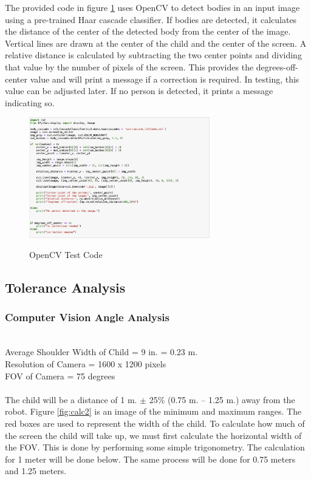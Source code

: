 \documentclass[journal,onecolumn, draftclsnofoot, 12pt]{IEEEtran}
\begin{document}
The provided code in figure \ref{fig:CVModule_TestCode} uses OpenCV to detect bodies in an input image using a pre-trained Haar cascade classifier. If bodies are detected, it calculates the distance of the center of the detected body from the center of the image. Vertical lines are drawn at the center of the child and the center of the screen. A relative distance is calculated by subtracting the two center points and dividing that value by the number of pixels of the screen. This provides the degrees-off-center value and will print a message if a correction is required. In testing, this value can be adjusted later. If no person is detected, it prints a message indicating so.

\begin{figure}[H]
\begin{center}
    \includegraphics[width=0.7\textwidth]{CVModule_TestCode.png}\\
    \caption{ OpenCV Test Code  } 
    \label{fig:CVModule_TestCode}
\end{center}
\end{figure}


\subsection{Tolerance Analysis}

\subsubsection{Computer Vision Angle Analysis}\;\\
\label{sec:anglecalc}
Average Shoulder Width of Child = 9 in. = 0.23 m. \\
Resolution of Camera = 1600 x 1200 pixels \\
FOV of Camera = 75 degrees \\
\\
The child will be a distance of 1 m. $\pm$ 25\% (0.75 m. -- 1.25 m.) away from the robot. Figure \ref{fig:calc2} is an image of the minimum and maximum ranges. The red boxes are used to represent the width of the child. 
To calculate how much of the screen the child will take up, we must first calculate the horizontal width of the FOV. This is done by performing some simple trigonometry. The calculation for 1 meter will be done below. The same process will be done for 0.75 meters and 1.25 meters. \\
\end{document}
